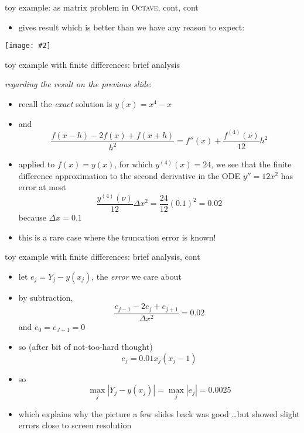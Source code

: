 \documentclass[10pt,hyperref]{beamer}
\newcommand{\Octave}{\textsc{Octave}\xspace}
\newcommand{\centerimage}[2]{\begin{center}
\texttt{[image: \#2]}
\end{center}}
\begin{document}
\begin{frame}{toy example: as matrix problem in \Octave, cont, cont} 

\begin{itemize}
\item gives result which is better than we have any reason to expect:
\end{itemize}

\centerimage{0.9}{toyfd-crop90}

\end{frame}



\begin{frame}{toy example with finite differences: brief analysis} 

\emph{regarding the result on the previous slide}:
\begin{itemize}
\item recall the \emph{exact} solution is $y(x) = x^4 - x$
\item and \small
	$$\frac{f(x-h) - 2 f(x) + f(x+h)}{h^2} = f''(x) + \frac{f^{(4)}(\nu)}{12} h^2$$
\normalsize
\item applied to $f(x)=y(x)$, for which $y^{(4)}(x) = 24$, we see that the finite difference approximation to the second derivative in the ODE $y'' = 12 x^2$ has error at most 
	$$\frac{y^{(4)}(\nu)}{12} \Delta x^2 = \frac{24}{12} (0.1)^2 = 0.02$$
because $\Delta x = 0.1$
\item this is a rare case where the truncation error is known!
\end{itemize}
\end{frame}


\begin{frame}{toy example with finite differences: brief analysis, cont} 

\begin{itemize}
\item let $e_j = Y_j - y(x_j)$, the \emph{error} we care about
\item by subtraction,
	$$\frac{e_{j-1} - 2 e_j + e_{j+1}}{\Delta x^2} = 0.02$$
and $e_0 = e_{J+1} = 0$
\item so (after bit of not-too-hard thought)
	$$e_j = 0.01 x_j (x_j - 1)$$
\item so
	$$\max_j |Y_j - y(x_j)| = \max_j |e_j| = 0.0025$$
\item which explains why the picture a few slides back was good \dots but showed slight errors close to screen resolution
\end{itemize}
\end{frame}
\end{document}
